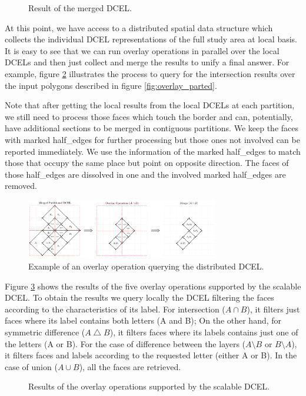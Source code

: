 \begin{figure}[!ht]
    \centering
        
    \caption{Result of the merged DCEL.}\label{fig:merged_dcel}
\end{figure}

At this point, we have access to a distributed spatial data structure which collects the individual DCEL representations of the full study area at local basis.  It is easy to see that we can run overlay operations in parallel over the local DCELs and then just collect and merge the results to unify a final answer.  For example, figure \ref{fig:overlay_parted2} illustrates the process to query for the intersection results over the input polygons described in figure \ref{fig:overlay_parted}.

Note that after getting the local results from the local DCELs at each partition, we still need to process those faces which touch the border and can, potentially, have additional sections to be merged in contiguous partitions.  We keep the faces with marked half\_edges for further processing but those ones not involved can be reported immediately.  We use the information of the marked half\_edges to match those that occupy the same place but point on opposite direction.  The faces of those half\_edges are dissolved in one and the involved marked half\_edges are removed. 

\begin{figure}[!ht]
    \centering
    \includegraphics[width=0.75\textwidth]{figures/03-OverlayParted2}
    \caption{Example of an overlay operation querying the distributed DCEL.}\label{fig:overlay_parted2}
\end{figure}

Figure \ref{fig:overlay_operations} shows the results of the five overlay operations supported by the scalable DCEL.  To obtain the results we query locally the DCEL filtering the faces according to the characteristics of its label.  For intersection ($A \cap B$), it filters just faces where its label contains both letters (A and B); On the other hand, for symmetric difference ($A \bigtriangleup B$), it filters faces where its labels contains just one of the letters (A or B).  For the case of difference between the layers ($A \setminus B$ or $B \setminus A$), it filters faces and labels according to the requested letter (either A or B). In the case of union ($A \cup B$), all the faces are retrieved. 

\begin{figure}[!ht]
    \centering
    
    \caption{Results of the overlay operations supported by the scalable DCEL.}\label{fig:overlay_operations}
\end{figure}

